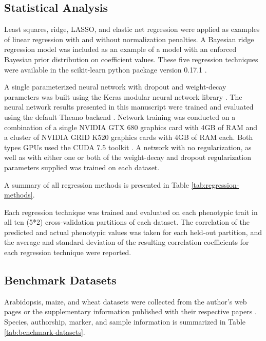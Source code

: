 \subsection*{Statistical Analysis} 

Least squares, ridge, LASSO, and elastic net regression were applied as examples of
linear regression with and without normalization penalties. A Bayesian ridge regression 
model was included as an example of a model with an enforced Bayesian prior distribution
on coefficient values. These five regression techniques were available in the 
scikit-learn python package version 0.17.1 \citep{scikit-learn}.

A single parameterized neural network with dropout and weight-decay parameters was built using 
the Keras modular neural network library \citep{chollet2015}. The neural network results presented in this
manuscript were trained and evaluated using the default Theano backend \citep{team2016}. 
Network training was conducted on a combination of a single NVIDIA GTX 680 graphics card with 4GB 
of RAM and a cluster of NVIDIA GRID K520 graphics cards with 4GB of RAM each. Both types GPUs used the 
CUDA 7.5 toolkit \citep{nickolls2008}. A network with no regularization,
as well as with either one or both of the weight-decay and dropout regularization parameters
supplied was trained on each dataset. 

A summary of all regression methods is presented in Table \ref{tab:regression-methods}.

\ifdefined\showtablesandfigures
\fi

Each regression technique was trained and evaluated on each phenotypic trait in all 
ten (5*2) cross-validation partitions of each dataset. The correlation of the 
predicted and actual phenotypic values was taken for each held-out partition, 
and the average and standard deviation of the resulting correlation coefficients 
for each regression technique were reported.

\subsection*{Benchmark Datasets}

Arabidopsis, maize, and wheat datasets were collected from the author's web pages
or the supplementary information published with their respective papers \citep{loudet2002, crossa2010, thavamanikumar2015}.
Species, authorship, marker, and sample information is summarized in Table \ref{tab:benchmark-datasets}.

